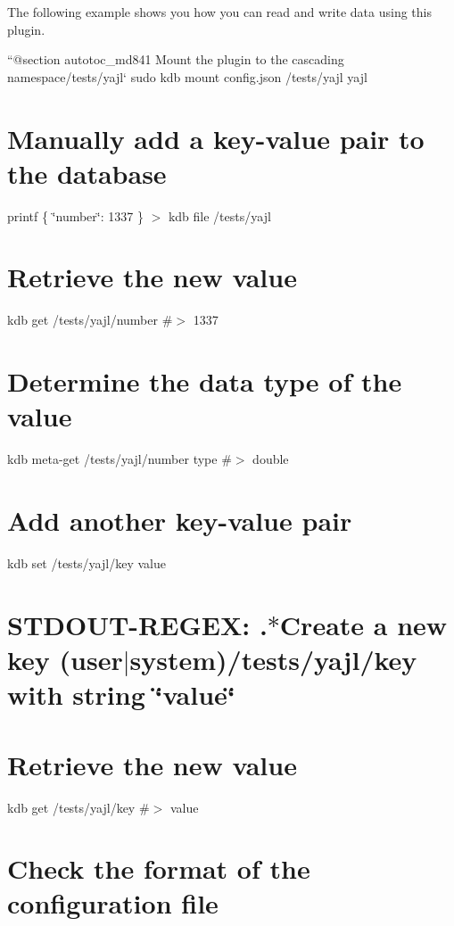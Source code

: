 The following example shows you how you can read and write data using this plugin.

``{\ttfamily  @section autotoc\+\_\+md841 Mount the plugin to the cascading namespace}/tests/yajl` sudo kdb mount config.\+json /tests/yajl yajl\hypertarget{autotoc_md835_autotoc_md842}{}\section{Manually add a key-\/value pair to the database}\label{autotoc_md835_autotoc_md842}
printf \textquotesingle{}\{ \char`\"{}number\char`\"{}\+: 1337 \}\textquotesingle{} $>$ {\ttfamily kdb file /tests/yajl}\hypertarget{autotoc_md835_autotoc_md843}{}\section{Retrieve the new value}\label{autotoc_md835_autotoc_md843}
kdb get /tests/yajl/number \#$>$ 1337\hypertarget{autotoc_md835_autotoc_md844}{}\section{Determine the data type of the value}\label{autotoc_md835_autotoc_md844}
kdb meta-\/get /tests/yajl/number type \#$>$ double\hypertarget{autotoc_md835_autotoc_md845}{}\section{Add another key-\/value pair}\label{autotoc_md835_autotoc_md845}
kdb set /tests/yajl/key value \hypertarget{autotoc_md835_autotoc_md846}{}\section{S\+T\+D\+O\+U\+T-\/\+R\+E\+G\+E\+X\+: .$\ast$\+Create a new key (user$\vert$system)/tests/yajl/key with string \char`\"{}value\char`\"{}}\label{autotoc_md835_autotoc_md846}
\hypertarget{autotoc_md835_autotoc_md847}{}\section{Retrieve the new value}\label{autotoc_md835_autotoc_md847}
kdb get /tests/yajl/key \#$>$ value\hypertarget{autotoc_md835_autotoc_md848}{}\section{Check the format of the configuration file}\label{autotoc_md835_autotoc_md848}

